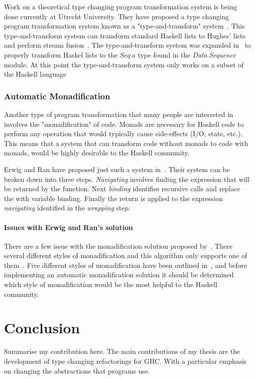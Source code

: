 Work on a theoretical type changing program transformation system is being done currently at Utrecht University. They have proposed a type changing program transformation system known as a "type-and-transform" system~\citep{typeAndTransform}. This type-and-transform system can transform standard Haskell lists to Hughes' lists and perform stream fusion~\citep{typeAndTransform}. The type-and-transform system was expanded in~\citep{typeAndTransformPatterns} to properly transform Haskel lists to the $Seq~a$ type found in the \textit{Data.Sequence} module. At this point the type-and-transform system only works on a subset of the Haskell language~\citep{typeAndTransform}

\subsection{Automatic Monadification}\label{erwigMonad}

Another type of program transformation that many people are interested in involves the "monadification" of code. Monads are necessary for Haskell code to perform any operation that would typically cause side-effects (I/O, state, etc.). This means that a system that can transform code without monads to code with monads, would be highly desirable to the Haskell community.

Erwig and Ran have proposed just such a system in~\citep{monadification}. Their system can be broken down into three steps. \textit{Navigating} involves finding the expression that will be returned by the function. Next \textit{binding} identifies recursive calls and replace the with variable binding. Finally the return is applied to the expression \textit{navigating} identified in the \textit{wrapping} step.

\subsubsection{Issues with Erwig and Ran's solution}

There are a few issue with the monadification solution proposed by~\citep{monadification}. There several different styles of monadification and this algorithm only supports one of them~\citep{clausMonadResponse}. Five different styles of monadification have been outlined in~\citep{monadSurvey}, and before implementing an automatic monadification solution it should be determined which style of monadification would be the most helpful to the Haskell community.

\chapter{Conclusion}
Summarise my contribution here. The main contributions of my thesis are the development of type changing refactorings for GHC. With a particular emphasis on changing the abstractions that programs use.



\cleardoublepage
{}
\label{index}
\printindex


